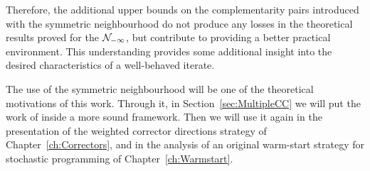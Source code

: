 Therefore, the additional upper bounds on the complementarity pairs
introduced with the symmetric neighbourhood do not produce any losses
in the theoretical results proved for the $\mathcal{N}_{-\infty}$, but 
contribute to providing a better practical environment.
This understanding provides some additional 
insight into the desired characteristics of a well-behaved iterate.

The use of the symmetric neighbourhood will be one of the theoretical
motivations of this work. Through it, in Section~\ref{sec:MultipleCC}
we will put the work of \cite{Gondzio96} inside a more sound framework.
Then we will use it again in the presentation of the weighted corrector
directions strategy of Chapter~\ref{ch:Correctors}, and in the analysis of an 
original warm-start strategy for stochastic programming of 
Chapter~\ref{ch:Warmstart}.
